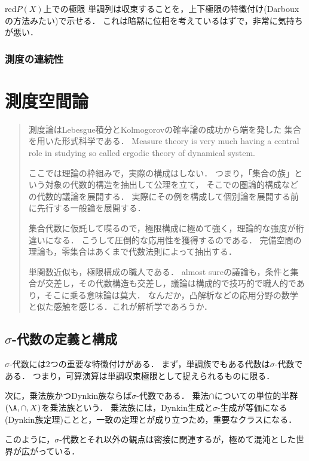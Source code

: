 \documentclass[uplatex, dvipdfmx]{jsreport}
\begin{document}
\begin{tbox}{red}{$P(X)$上での極限}
    単調列は収束することを，上下極限の特徴付け(Darbouxの方法みたい)で示せる．
    これは暗黙に位相を考えているはずで，非常に気持ちが悪い．
\end{tbox}

\subsection{測度の連続性}

\chapter{測度空間論}

\begin{quotation}
    測度論はLebesgue積分とKolmogorovの確率論の成功から端を発した
    集合を用いた形式科学である．
    Measure theory is very much having a central role in studying so called ergodic theory of dynamical system.

    ここでは理論の枠組みで，実際の構成はしない．
    つまり，「集合の族」という対象の代数的構造を抽出して公理を立て，
    そこでの圏論的構成などの代数的議論を展開する．
    実際にその例を構成して個別論を展開する前に先行する一般論を展開する．

    集合代数に仮託して喋るので，極限構成に極めて強く，理論的な強度が桁違いになる．
    こうして圧倒的な応用性を獲得するのである．
    完備空間の理論も，零集合はあくまで代数法則によって抽出する．

    単関数近似も，極限構成の職人である．
    almost sureの議論も，条件と集合が交差し，その代数構造も交差し，議論は構成的で技巧的で職人的であり，そこに乗る意味論は莫大．
    なんだか，凸解析などの応用分野の数学と似た感触を感じる．これが解析学であろうか．
\end{quotation}

\section{$\sigma$-代数の定義と構成}

\begin{tcolorbox}[colframe=ForestGreen, colback=ForestGreen!10!white,breakable,colbacktitle=ForestGreen!40!white,coltitle=black,fonttitle=\bfseries\sffamily,
title=集合代数の構造のうち，真に注目すべき代数的構造が$\sigma$-代数]
    $\sigma$-代数には2つの重要な特徴付けがある．
    まず，単調族でもある代数は$\sigma$-代数である．
    つまり，可算演算は単調収束極限として捉えられるものに限る．

    次に，乗法族かつDynkin族ならば$\sigma$-代数である．
    乗法$\cap$についての単位的半群
    $(\A,\cap,X)$を乗法族という．
    乗法族には，Dynkin生成と$\sigma$-生成が等価になる(Dynkin族定理)ことと，一致の定理とが成り立つため，重要なクラスになる．

    このように，$\sigma$-代数とそれ以外の観点は密接に関連するが，極めて混沌とした世界が広がっている．
\end{tcolorbox}
\end{document}
